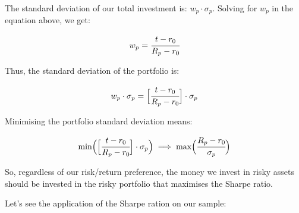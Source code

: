 The standard deviation of our total investment is:
\(w_p\cdot \sigma_p\). Solving for \(w_p\) in the equation above, we
get:

\[ w_p = \cfrac{t - r_0}{R_p - r_0} \]

Thus, the standard deviation of the portfolio is:

\[ w_p\cdot \sigma_p = \Big[\cfrac{t - r_0}{R_p - r_0}\Big]\cdot \sigma_p \]

Minimising the portfolio standard deviation means:

\[ \textrm{min}\Big(\Big[\cfrac{t - r_0}{R_p - r_0}\Big]\cdot \sigma_p\Big)\implies\textrm{max}\Big(\cfrac{R_p - r_0}{\sigma_p}\Big) \]

So, regardless of our risk/return preference, the money we invest in
risky assets should be invested in the risky portfolio that maximises
the Sharpe ratio.

Let's see the application of the Sharpe ration on our sample:

